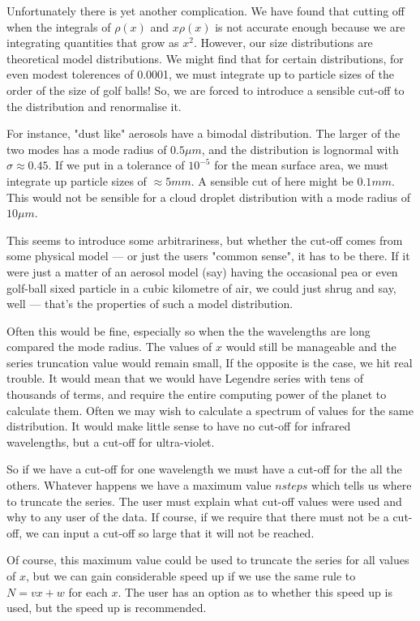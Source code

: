 \documentclass[12pt]{article}
\begin{document}
\begin{flushleft}
Unfortunately there is yet another complication. We have found that cutting off
 when the integrals of $\rho(x)$ and $ x \rho(x)$ is not accurate enough
 because we are integrating quantities that grow as $x^2$. However, our
 size distributions are theoretical model distributions. We might find that for
certain distributions, for even modest tolerences of 0.0001, we must integrate
up to particle sizes of the order of the size of golf balls! So, we are forced
to introduce a sensible cut-off to the distribution and renormalise it.

For instance, "dust like" aerosols have a bimodal distribution. The
larger of the two modes has a mode radius of $0.5 \mu m$, and the distribution
is lognormal with $\sigma \approx 0.45$. If we put in a tolerance of
$10^{-5}$ for the mean surface area, we must integrate up  particle
sizes of $\approx 5mm$. A sensible cut of here might be $0.1mm$. This
would not be sensible for a cloud droplet distribution with a mode radius of $10\mu m$.

This seems to introduce some arbitrariness, but whether the cut-off comes
from some physical model --- or just the users "common sense", it has to be
there. If it were just a matter of an aerosol model (say) having the occasional
 pea or even golf-ball sixed particle in a cubic kilometre of air, we could
just shrug and say, well --- that's the properties of such a model distribution.

Often this would be fine, especially so when the the wavelengths are long
compared the mode radius. The values of $x$ would still be manageable
 and the series truncation value would remain small,
If the opposite is the case, we hit real trouble.
It would mean that we would have Legendre series with
tens of thousands of terms, and require the entire computing power of the planet to
calculate them. Often we may wish to calculate a spectrum of values for
the same distribution. It would make little sense to have no cut-off for
infrared wavelengths, but a cut-off for ultra-violet. 

So if we have a cut-off 
for one wavelength we must have a cut-off for the all the others.
Whatever happens we have a maximum value $nsteps$ which tells us 
where to truncate the series. The user must explain what cut-off values
were used and why to any user of the data. If course, if we require
that there must not be a cut-off, we can input a cut-off so large
that it will not be reached.

 Of course, this maximum value could be used to truncate the series
for all values of $x$, but we can gain considerable speed up if we use the same
rule to $N=v x+w$ for each $x$. The user has an option as to whether this speed up
is used, but the speed up is recommended.


\end{flushleft}
\end{document}
